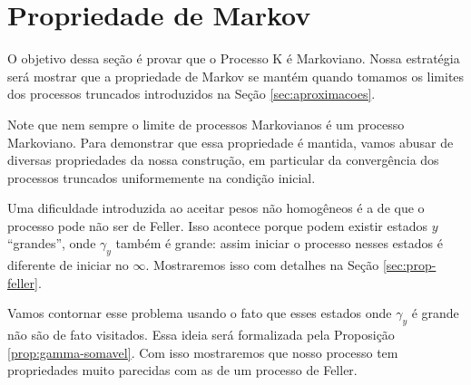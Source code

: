 
\section{Propriedade de Markov}
\label{sec:prop-markov}

O objetivo dessa seção é provar que o Processo K é Markoviano. Nossa
estratégia será mostrar que a propriedade de Markov se mantém quando
tomamos os limites dos processos truncados introduzidos na Seção
\ref{sec:aproximacoes}.

Note que nem sempre o limite de processos Markovianos é um processo
Markoviano. Para demonstrar que essa propriedade é mantida, vamos
abusar de diversas propriedades da nossa construção, em particular da
convergência dos processos truncados uniformemente na condição
inicial.

Uma dificuldade introduzida ao aceitar pesos não homogêneos é a de que
o processo pode não ser de Feller. Isso acontece porque podem existir
estados $y$ ``grandes'', onde $\gamma_y$ também é grande: assim
iniciar o processo nesses estados é diferente de iniciar no
$\infty$. Mostraremos isso com detalhes na Seção
\ref{sec:prop-feller}.

Vamos contornar esse problema usando o fato que esses estados onde
$\gamma_y$ é grande não são de fato visitados. Essa ideia será
formalizada pela Proposição \ref{prop:gamma-somavel}. Com isso
mostraremos que nosso processo tem propriedades muito parecidas com as
de um processo de Feller.

